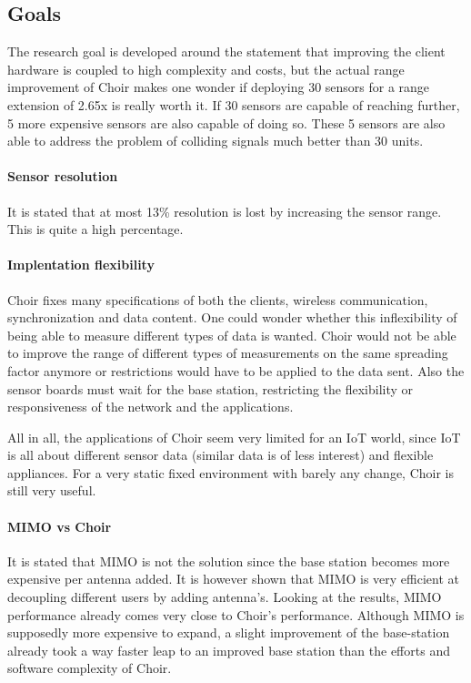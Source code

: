 \documentclass[a4paper,journal]{IEEEtran_custom}
\begin{document}
\subsection{Goals}
The research goal is developed around the statement that improving the client hardware is coupled to high complexity and costs, but the actual range improvement of Choir makes one wonder if deploying 30 sensors for a range extension of 2.65x is really worth it. If 30 sensors are capable of reaching further, 5 more expensive sensors are also capable of doing so. These 5 sensors are also able to address the problem of colliding signals much better than 30 units.

\paragraph{Sensor resolution} It is stated that at most 13\% resolution is lost by increasing the sensor range. This is quite a high percentage.

\paragraph{Implentation flexibility} Choir fixes many specifications of both the clients, wireless communication, synchronization and data content. One could wonder whether this inflexibility of being able to measure different types of data is wanted. Choir would not be able to improve the range of different types of measurements on the same spreading factor anymore or restrictions would have to be applied to the data sent. 
Also the sensor boards must wait for the base station, restricting the flexibility or responsiveness of the network and the applications.

All in all, the applications of Choir seem very limited for an IoT world, since IoT is all about different sensor data (similar data is of less interest) and flexible appliances. For a very static fixed environment with barely any change, Choir is still very useful.

\paragraph{MIMO vs Choir} It is stated that MIMO is not the solution since the base station becomes more expensive per antenna added. It is however shown that MIMO is very efficient at decoupling different users by adding antenna's. Looking at the results, MIMO performance already comes very close to Choir's performance. Although MIMO is supposedly more expensive to expand, a slight improvement of the base-station already took a way faster leap to an improved base station than the efforts and software complexity of Choir. \\
\end{document}

